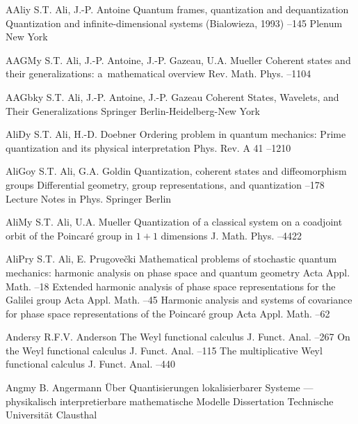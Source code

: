 \documentclass[11pt]{amsart}
\numberwithin{equation}{section}
\theoremstyle{remark}
\newcommand{\by}{\mathbf y}
\begin{document}
\begin{thebibliography}{199}
 AAli\by{ S.T. Ali, J.-P. Antoine \paper Quantum frames, quantization and
dequantization \inbook Quantization and infinite-dimensional systems
(Bialowieza, 1993) --145 \publ Plenum \publaddr New York }

 AAGM\by{ S.T. Ali, J.-P. Antoine, J.-P. Gazeau, U.A. Mueller \paper
Coherent states and their generalizations: a~mathematical overview \jour Rev.
Math. Phys.   --1104}

 AAGbk\by{ S.T. Ali, J.-P. Antoine, J.-P. Gazeau \book Coherent States,
Wavelets, and Their Generalizations \publ Springer \publaddr
Berlin-Heidelberg-New York }

 AliD\by{ S.T. Ali, H.-D. Doebner \paper Ordering problem in quantum
mechanics: Prime quantization and its physical interpretation \jour Phys.
Rev. \vol A 41  --1210}

 AliGo\by{ S.T. Ali, G.A. Goldin \paper Quantization, coherent states and
diffeomorphism groups \inbook Differential geometry, group representations, and
quantization --178 \bookinfo Lecture Notes in Phys.  \publ
Springer \publaddr Berlin }

 AliM\by{ S.T. Ali, U.A. Mueller \paper Quantization of a classical system
on a coadjoint orbit of the Poincar\'e group in $1+1$ dimensions
\jour J. Math. Phys.   --4422}

 AliPr\by{ S.T. Ali, E. Prugove\v cki \paper Mathematical problems of
stochastic quantum mechanics: harmonic analysis on phase space and quantum
geometry \jour Acta Appl. Math.   --18 \moreref \paper
Extended harmonic analysis of phase space representations for the Galilei group
\jour Acta Appl. Math.   --45 \moreref \paper Harmonic
analysis and systems of covariance for phase space representations of the
Poincar\'e group \jour Acta Appl. Math.   --62}

 Anders\by{ R.F.V. Anderson \paper The Weyl functional calculus \jour J.
Funct. Anal.   --267 \moreref \paper On the Weyl
functional calculus \jour J. Funct. Anal.   --115
\moreref \paper The multiplicative Weyl functional calculus \jour J. Funct.
Anal.   --440}

 Angm\by{ B. Angermann \book \"Uber Quantisierungen lokalisierbarer
Systeme --- physikalisch interpretierbare mathematische Modelle \bookinfo
Dissertation \publ Technische Universit\"at Clausthal }


\end{thebibliography}
\end{document}
